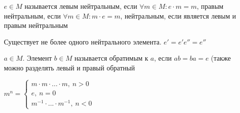 \begin{conj}
    $e \in M$ называется левым нейтральным, если $\forall m \in M: e\cdot m = m$, правым нейтральным, если $\forall m \in M: m\cdot e = m$, нейтральным, если является левым и правым нейтральным
\end{conj}
\begin{theorem-non}
    Существует не более одного нейтрального элемента. $e' = e'e'' = e''$
\end{theorem-non}
\begin{conj}
    $a \in M$. Элемент $b \in M$ называется обратимым к $a$, если $ab = ba = e$ (также можно разделять левый и правый обратный
\end{conj}
\begin{conj}
    $m^n = \begin{cases}
    m\cdot m\cdot ...\cdot m,\ n>0\\
    e,\ n=0\\
    m^{-1}\cdot ... \cdot m^{-1},\ n<0
    \end{cases}$
\end{conj}